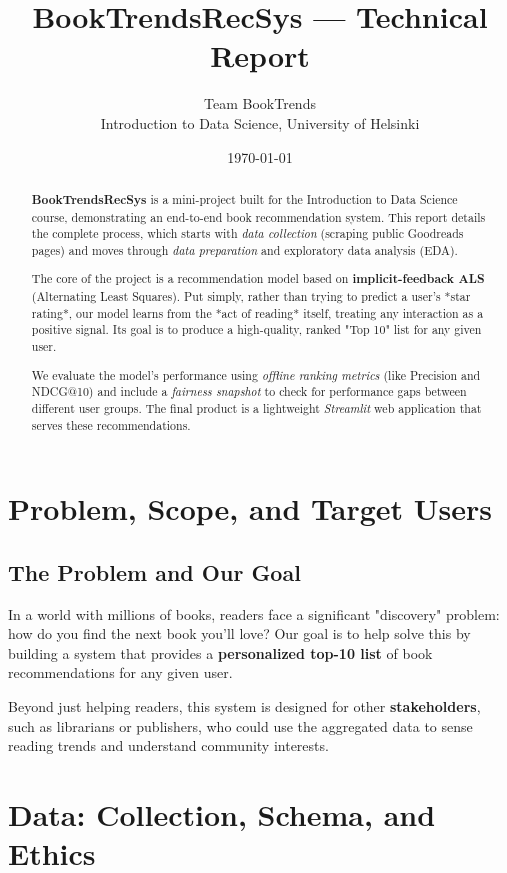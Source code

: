 \documentclass[11pt,a4paper]{article}
\title{\textbf{BookTrendsRecSys} — Technical Report}
\author{Team BookTrends\\Introduction to Data Science, University of Helsinki}
\date{\today}
\begin{document}
\maketitle

\begin{abstract}
\noindent
\textbf{BookTrendsRecSys} is a mini-project built for the Introduction to Data Science course, demonstrating an end-to-end book recommendation system. This report details the complete process, which starts with \emph{data collection} (scraping public Goodreads pages) and moves through \emph{data preparation} and exploratory data analysis (EDA). 

The core of the project is a recommendation model based on \textbf{implicit-feedback ALS} (Alternating Least Squares). Put simply, rather than trying to predict a user's *star rating*, our model learns from the *act of reading* itself, treating any interaction as a positive signal. Its goal is to produce a high-quality, ranked "Top 10" list for any given user.

We evaluate the model's performance using \emph{offline ranking metrics} (like Precision and NDCG@10) and include a \emph{fairness snapshot} to check for performance gaps between different user groups. The final product is a lightweight \emph{Streamlit} web application that serves these recommendations. 
\end{abstract}

\section{Problem, Scope, and Target Users}

\subsection*{The Problem and Our Goal}
In a world with millions of books, readers face a significant "discovery" problem: how do you find the next book you'll love? Our goal is to help solve this by building a system that provides a \textbf{personalized top-10 list} of book recommendations for any given user.

Beyond just helping readers, this system is designed for other \textbf{stakeholders}, such as librarians or publishers, who could use the aggregated data to sense reading trends and understand community interests.



\section{Data: Collection, Schema, and Ethics}
\end{document}
